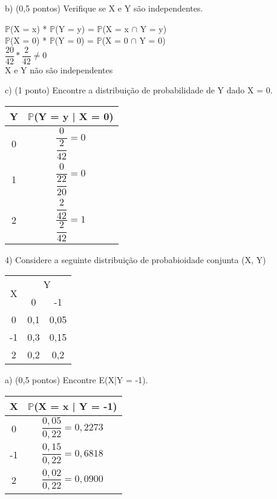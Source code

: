 \documentclass[12pt,a4paper]{article}
\begin{document}
	\vspace{1cm}
	b) (0,5 pontos) Verifique se X e Y são independentes.\\
	\begin{center}
			$\mathbb{P}$(X = x) * $\mathbb{P}$(Y = y) = $\mathbb{P}$(X = x $\cap$ Y = y)
			\vspace{0.5cm}\\
			$\mathbb{P}$(X = 0) * $\mathbb{P}$(Y = 0) = $\mathbb{P}$(X = 0 $\cap$ Y = 0)\\
			\vspace{0.25cm}
			$\dfrac{20}{42} * \dfrac{2}{42} \neq 0$\\
			\vspace{1cm}
			X e Y não são independentes
	\end{center}
	\vspace{1cm}
	c) (1 ponto) Encontre a distribuição de probabilidade de Y dado X = 0.\\
	\begin{center}
		\begin{tabular}{cc}
			Y & $\mathbb{P}$(Y = y | X = 0)\\ \midrule
			0 & $\dfrac{0}{\dfrac{2}{42}} = 0$\\ \midrule
			1 & $\dfrac{0}{\dfrac{22}{20}} = 0$\\ \midrule
			2 & $\dfrac{\dfrac{2}{42}}{\dfrac{2}{42}} = 1$\\ \midrule
		\end{tabular}
	\end{center}
	\vspace{1cm}
	4) Considere a seguinte distribuição de probabioidade conjunta (X, Y)
	\vspace{0.25cm}\\
	\begin{center}
		\begin{tabular}{|c|c|c|}\hline
			\multirow{2}{*}{X} & \multicolumn{2}{c|}{Y}\\ \cline{2-3}
			& 0 & -1\\ \hline
			0 & 0,1 & 0,05\\ \hline
			-1 & 0,3 & 0,15\\ \hline
			2 & 0,2 & 0,2\\ \hline
		\end{tabular}
	\end{center}
	\vspace{0.25cm}
	a) (0,5 pontos) Encontre E(X|Y = -1).\\
	\vspace{0.5cm}
	\begin{center}
		\begin{tabular}{cc}
			X & $\mathbb{P}$(X = x | Y = -1)\\ \midrule
			0 & $\dfrac{0,05}{0,22} = 0,2273$\\ \midrule
			-1 & $\dfrac{0,15}{0,22} = 0,6818$\\ \midrule
			2 & $\dfrac{0,02}{0,22} = 0,0900$\\ \midrule
		\end{tabular}
	\end{center}
\end{document}

